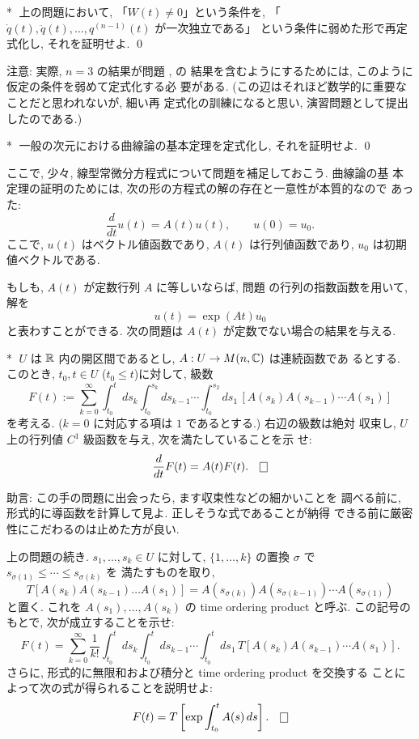 \documentclass[12pt,twoside]{jarticle}
\def\qstar#1{$\!\!\!$#1$\;$}
\begin{document}
\begin{question}\qstar{*}
  上の問題において, 「$W(t) \ne 0$」という条件を, %
  「$\dot{q}(t), \ddot{q}(t), \dots, q^{(n-1)}(t)$ が一次独立である」
  という条件に弱めた形で再定式化し, それを証明せよ. \qed
\end{question}

\noindent 注意: 実際, $n=3$ の結果が問題 ,  の
結果を含むようにするためには, このように仮定の条件を弱めて定式化する必
要がある. (この辺はそれほど数学的に重要なことだと思われないが, 細い再
定式化の訓練になると思い, 演習問題として提出したのである.)

\begin{question}\qstar{*}
  一般の次元における曲線論の基本定理を定式化し, それを証明せよ. \qed
\end{question}

ここで, 少々, 線型常微分方程式について問題を補足しておこう. 曲線論の基
本定理の証明のためには, 次の形の方程式の解の存在と一意性が本質的なので
あった:
\[
  \frac{d}{dt} u(t) = A(t) u(t),
  \qquad
  u(0) = u_0.
\]%
ここで, $u(t)$ はベクトル値函数であり, $A(t)$ は行列値函数であり, 
$u_0$ は初期値ベクトルである.

もしも, $A(t)$ が定数行列 $A$ に等しいならば, 問題 
 の行列の指数函数を用いて, 解を
\[
  u(t) = \exp(At) u_0
\]
と表わすことができる. 次の問題は $A(t)$ が定数でない場合の結果を与える.

\begin{question}\label{q:DS1}\qstar{*}
  $U$ は ${\mathbb R}$ 内の開区間であるとし, $A: U \to M(n,{\mathbb C})$ は連続函数であ
  るとする. このとき, $t_0, t \in U$ ($t_0 \le t$)に対して, 級数
  \[
    F(t)
    :=
    \sum_{k=0}^\infty
    \int_{t_0}^t ds_k \int_{t_0}^{s_k} ds_{k-1} \cdots \int_{t_0}^{s_2} ds_1\,
    [ A(s_k)A(s_{k-1})\cdots A(s_1) ]
  \] %
  を考える. ($k=0$ に対応する項は $1$ であるとする.) 右辺の級数は絶対
  収束し, $U$ 上の行列値 $C^1$ 級函数を与え, 次を満たしていることを示
  せ:
  \[
    \frac{d}{dt} F(t) = A(t) F(t).
  \qed
  \]
\end{question}

\noindent 助言: この手の問題に出会ったら, ます収束性などの細かいことを
調べる前に, 形式的に導函数を計算して見よ. 正しそうな式であることが納得
できる前に厳密性にこだわるのは止めた方が良い. 

\begin{question}\label{q:DS2}
  上の問題の続き. $s_1,\dots,s_k\in U$ に対して, %
  $\{1,\dots,k\}$ の置換 $\sigma$ で %
  $s_{\sigma(1)} \le \cdots \le s_{\sigma(k)}$ を
  満たすものを取り, 
  \[
    T[A(s_k) A(s_{k-1}) \dots A(s_1)]
    =
    A(s_{\sigma(k)}) A(s_{\sigma(k-1)}) \cdots A(s_{\sigma(1)})
  \]
  と置く. これを $A(s_1),\dots,A(s_k)$ の time ordering product と呼ぶ.
  この記号のもとで, 次が成立することを示せ:
  \[
    F(t)
    =
    \sum_{k=0}^\infty
    \frac{1}{k!}
    \int_{t_0}^t ds_k \int_{t_0}^t ds_{k-1} \cdots \int_{t_0}^t ds_1\,
    T[ A(s_k)A(s_{k-1})\cdots A(s_1) ].
  \]%
  さらに, 形式的に無限和および積分と time ordering product を交換する
  ことによって次の式が得られることを説明せよ:
  \[
    F(t) = T\left[ \exp \int_{t_0}^t A(s)\,ds \right].
  \qed
  \]
\end{question}
\end{document}
